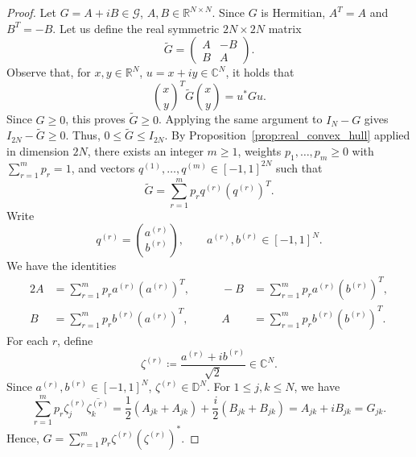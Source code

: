 \documentclass[reqno,a4paper,12pt]{amsart}
\numberwithin{equation}{section}
\def\R{{\mathbb R}}
\def\D{{\mathbb D}}
\newcommand\1{\mathds{1}}
\begin{document}
\begin{proof}
    Let $G=A+iB\in\mathcal G$, $A,B\in \R^{N\times N}$. Since $G$ is Hermitian, $A^T=A$ and $B^T=-B$. Let us define the real symmetric $2N\times 2N$ matrix
    \begin{equation*}
    \widetilde G=
    \begin{pmatrix}
    A & -B \\
    B & A
    \end{pmatrix}.
    \end{equation*}
    Observe that, for $x,y\in\mathbb R^N$,  $u=x+iy\in\mathbb C^N$, it holds that
    \begin{equation*}
    \binom{x}{y}^T
    \widetilde G
    \binom{x}{y}
    =
    u^*Gu.
    \end{equation*}
    Since $G\ge 0$, this proves $\widetilde G\ge 0$. Applying the same argument to $I_N-G$ gives $I_{2N}-\widetilde G\ge 0$. Thus, $0\le \widetilde G\le I_{2N}$. By Proposition~\ref{prop:real_convex_hull} applied in dimension $2N$, there exists an integer $m\ge 1$, weights $p_1,\ldots,p_m\ge 0$ with $\sum_{r=1}^m p_r=1$, and vectors $q^{(1)},\ldots,q^{(m)}\in [-1,1]^{2N}$ such that
    \begin{equation*}
    \widetilde G
    =
    \sum_{r=1}^m p_r q^{(r)}(q^{(r)})^T.
    \end{equation*}
    Write
    \begin{equation*}
    q^{(r)}
    =
    \binom{a^{(r)}}{b^{(r)}},
    \qquad
    a^{(r)},b^{(r)}\in [-1,1]^N.
    \end{equation*}
    We have the identities 
    \begin{alignat*}{2}
        A&=\sum_{r=1}^m p_r a^{(r)}(a^{(r)})^T,& \qquad
        -B&=\sum_{r=1}^m p_r a^{(r)}(b^{(r)})^T, \\
        B&=\sum_{r=1}^m p_r b^{(r)}(a^{(r)})^T,& \qquad 
        A&=\sum_{r=1}^m p_r b^{(r)}(b^{(r)})^T. 
    \end{alignat*}
    For each $r$, define
    \begin{equation*}
    \zeta^{(r)}
    \coloneqq
    \frac{a^{(r)}+i b^{(r)}}{\sqrt 2}
    \in\mathbb C^N.
    \end{equation*}
    Since $a^{(r)},b^{(r)}\in [-1,1]^N$, $\zeta^{(r)}\in \D^N$. For $1\le j,k\le N$, we have
    \begin{equation*}
        \sum_{r=1}^m p_r
        \zeta_j^{(r)}\overline{\zeta_k^{(r)}}
        =
        \frac12(A_{jk}+A_{jk})
        +
        \frac{i}{2}(B_{jk}+B_{jk})
        =
        A_{jk}+iB_{jk}
        =
        G_{jk}.
    \end{equation*}
    Hence, $G= \sum_{r=1}^m p_r\zeta^{(r)}(\zeta^{(r)})^*$.
\end{proof}
\end{document}
